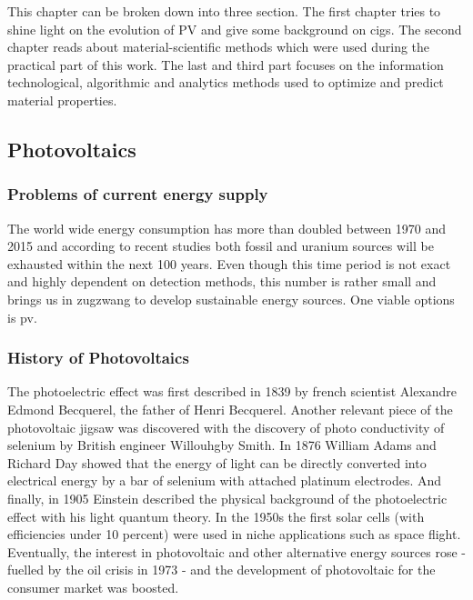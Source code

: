 This chapter can be broken down into three section. 
The first chapter tries to shine light on the evolution of PV and give some background on \gls{cigs}.
The second chapter reads about material-scientific methods which were used during the practical part of this work. 
The last and third part focuses on the information technological, algorithmic and analytics methods used to optimize and predict material properties. 

\subsection{Photovoltaics}
\subsubsection{Problems of current energy supply}
The world wide energy consumption has more than doubled between 1970 and 2015\cite{BP2017} 
and according to recent studies both fossil\cite{BGR2017} and uranium sources\cite{Uran2006} 
will be exhausted within the next 100 years. 
Even though this time period is not exact and highly dependent on detection methods, 
this number is rather small and brings us in zugzwang to develop sustainable energy sources. 
One viable options is \gls{pv}.

\subsubsection{History of Photovoltaics}
The photoelectric effect was first described in 1839 by french scientist Alexandre 
Edmond Becquerel, the father of Henri Becquerel\cite{becquerel1839memoire}. 
Another relevant piece of the photovoltaic jigsaw was discovered 
with the discovery of photo conductivity of selenium
by British engineer Willouhgby Smith\cite{Smith1873Selenium}.
In 1876 William Adams and Richard Day\cite{Adams1876Selenium} showed that 
the energy of light can be directly converted into electrical energy by a bar of 
selenium with attached platinum electrodes.
And finally, in 1905 Einstein described the physical background of the photoelectric 
effect with his light quantum theory\cite{einstein1905erzeugung}.
In the 1950s the first solar cells (with efficiencies under 10 percent) were used in niche applications such as space flight. 
Eventually, the interest in photovoltaic and other alternative energy sources 
rose - fuelled by the oil crisis in 1973 - 
and the development of photovoltaic for the consumer market was boosted. \\


